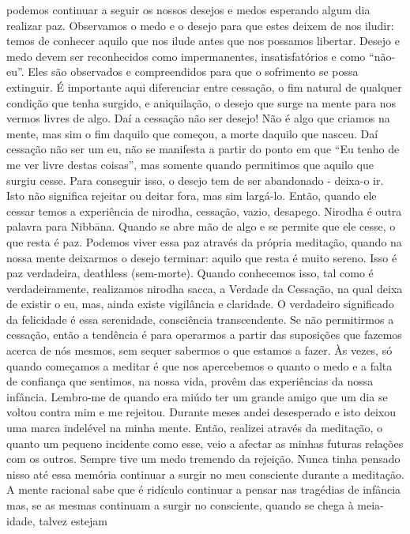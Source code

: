 podemos continuar a seguir os nossos desejos e medos
esperando algum dia realizar paz. Observamos o medo e o
desejo para que estes deixem de nos iludir: temos de conhecer
aquilo que nos ilude antes que nos possamos libertar. Desejo
e medo devem ser reconhecidos como impermanentes,
insatisfatórios e como “não-eu”. Eles são observados e
compreendidos para que o sofrimento se possa extinguir.
É importante aqui diferenciar entre cessação, o fim natural
de qualquer condição que tenha surgido, e aniquilação, o
desejo que surge na mente para nos vermos livres de algo. Daí
a cessação não ser desejo! Não é algo que criamos na mente,
mas sim o fim daquilo que começou, a morte daquilo que
nasceu. Daí cessação não ser um eu, não se manifesta a partir
do ponto em que “Eu tenho de me ver livre destas coisas”,
mas somente quando permitimos que aquilo que surgiu cesse.
Para conseguir isso, o desejo tem de ser abandonado - deixa-o
ir. Isto não significa rejeitar ou deitar fora, mas sim largá-lo.
Então, quando ele cessar temos a experiência de nirodha,
cessação, vazio, desapego. Nirodha é outra palavra para
Nibbāna. Quando se abre mão de algo e se permite que ele
cesse, o que resta é paz.
Podemos viver essa paz através da própria meditação,
quando na nossa mente deixarmos o desejo terminar: aquilo
que resta é muito sereno. Isso é paz verdadeira, deathless
(sem-morte). Quando conhecemos isso, tal como é verdadeiramente, realizamos nirodha sacca, a Verdade da Cessação,
na qual deixa de existir o eu, mas, ainda existe vigilância e
claridade. O verdadeiro significado da felicidade é essa
serenidade, consciência transcendente.
Se não permitirmos a cessação, então a tendência é para
operarmos a partir das suposições que fazemos acerca de nós
mesmos, sem sequer sabermos o que estamos a fazer. Às
vezes, só quando começamos a meditar é que nos apercebemos o quanto o medo e a falta de confiança que sentimos, na
nossa vida, provêm das experiências da nossa infância.
Lembro-me de quando era miúdo ter um grande amigo que
um dia se voltou contra mim e me rejeitou. Durante meses
andei desesperado e isto deixou uma marca indelével na
minha mente. Então, realizei através da meditação, o quanto
um pequeno incidente como esse, veio a afectar as minhas
futuras relações com os outros. Sempre tive um medo tremendo da rejeição. Nunca tinha pensado nisso até essa memória
continuar a surgir no meu consciente durante a meditação. A
mente racional sabe que é ridículo continuar a pensar nas
tragédias de infância mas, se as mesmas continuam a surgir
no consciente, quando se chega à meia-idade, talvez estejam
